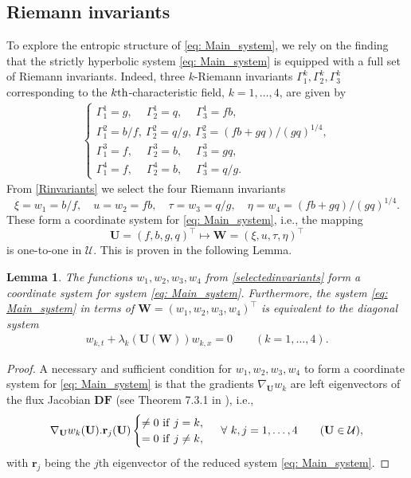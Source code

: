 \documentclass[11pt]{article}
\numberwithin{equation}{section}
\newtheorem{lemma}[theorem]{Lemma}
\newtheorem{counter example}[theorem]{Counter Example}
\begin{document}
{\subsection{Riemann invariants}\label{sec: Riemann_invariants}
To explore the entropic structure of \eqref{eq: Main_system}, we rely on the finding that the strictly hyperbolic system \eqref{eq: Main_system} is equipped with a full set of  Riemann invariants. Indeed, three $k$-Riemann invariants $\Gamma_1^k,\Gamma_2^k,\Gamma_3^k$ corresponding to the $k\rm{th}$-characteristic field, $k=1,\ldots, 4$, are given by 
\begin{align}
\begin{cases}
\Gamma_1^1=g,~\quad\Gamma_2^1=q,~\quad\Gamma_3^1=fb,\\
    \Gamma_1^2 ={b}/{f},~\Gamma_2^2={q}/{g},~\Gamma_3^2={(fb+gq)}/{(gq)^{1/4}},\\
    \Gamma_1^3=f,~\quad\Gamma_2^3=b,~\quad\Gamma_3^3=gq,\\
   \Gamma_1^4=f,~\quad\Gamma_2^4=b,~\quad\Gamma_3^4={q}/{g}.
\end{cases}   \label{Rinvariants} 
\end{align}
From \eqref{Rinvariants} we select the four Riemann invariants 
\begin{equation}\label{selectedinvariants}
\xi=w_1=b/f, \quad     u= w_2 = fb,  \quad \tau = w_3 = q/g, \quad 
\eta = w_4=(fb+gq)/(gq)^{1/4}.
\end{equation}
These form a coordinate system for \eqref{eq: Main_system}, i.e., the mapping 
\[
\mathbf{U}  = (f,b,g,q)^\top \mapsto \mathbf{W}= (\xi,u,\tau,\eta)^\top
\]
is one-to-one in $\mathcal U$.  This is proven in the following Lemma.
\begin{lemma}\label{lemma}
The functions  $w_1, w_2, w_3, w_4$  from  \eqref{selectedinvariants}  form a coordinate system for system \eqref{eq: Main_system}. Furthermore,  the system \eqref{eq: Main_system} in terms of $\mathbf{W}= (w_1,w_2,w_3,w_4)^\top$ is equivalent to the diagonal system
\begin{align}\label{diagonal_form}w_{k,t}+\lambda_k(\mathbf{U}(\mathbf{W})){ w_{k,x} }=0 \qquad (k=1, \ldots,4).
\end{align}
\end{lemma}
\begin{proof}
A necessary and sufficient condition for $w_1, w_2, w_3, w_4$ to form a coordinate system  for \eqref{eq: Main_system} is that the gradients 
$\nabla_{\mathbf{U}}w_k$ 
are left eigenvectors of  the flux Jacobian  $\mathbf{D} \mathbf{F}$ (see Theorem 7.3.1 in \cite{dafermos2005hyperbolic}), i.e.,
\begin{align}\label{eq: Rinvariantsconditions}
\nabla_{\mathbf{U}}w_k(\mathbf{U}).\mathbf{r}_j(\mathbf{U})\begin{cases}
    \neq 0 ~{\rm{if}}~j=k,\\
    = 0 ~{\rm{if}}~j\neq k,
\end{cases}~\forall~k, j =1, \ldots, 4\qquad (\mathbf{U} \in \mathcal U),
\end{align}
with $\mathbf{r}_j$  being  the $j$th eigenvector of the reduced system \eqref{eq: Main_system}.


\end{proof}}
\end{document}
